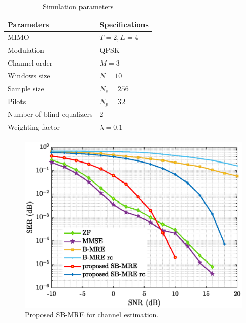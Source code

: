 \begin{table}[H]
\centering
\caption{Simulation parameters}
\label{tab:simulation_param}
    \begin{tabular}{p{6cm} | p{4cm}}
    \hline
    \hline
    \textbf{Parameters} & \textbf{Specifications}  \\ \hline
    MIMO                            & $T = 2, L= 4$      \\ \hline
     Modulation                     & QPSK       \\ \hline
    Channel order                   & $M = 3$      \\ \hline
    Windows size                    & $N = 10$     \\ \hline
    Sample size                     & $N_s = 256$  \\ \hline
    Pilots                          & $N_p = 32$   \\ \hline
    Number of blind equalizers      & $2$ \\ \hline
    Weighting factor                & $\lambda = 0.1$   \\ \hline
    \end{tabular}
\end{table}


\begin{figure}[ht]
    \centering
    \includegraphics[width=.8\linewidth]{figures/performance.eps}
    \caption{Proposed SB-MRE for channel estimation.}
    \label{fig:performance}
\end{figure}

